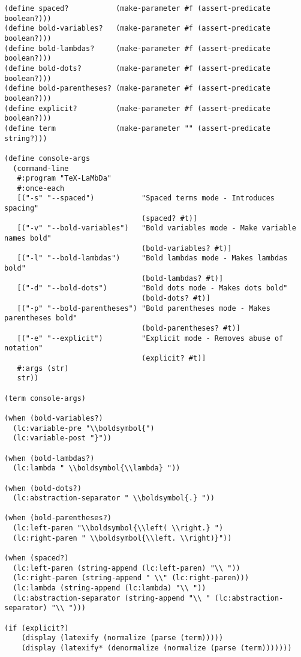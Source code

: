 \begin{verbatim}
(define spaced?           (make-parameter #f (assert-predicate boolean?)))
(define bold-variables?   (make-parameter #f (assert-predicate boolean?)))
(define bold-lambdas?     (make-parameter #f (assert-predicate boolean?)))
(define bold-dots?        (make-parameter #f (assert-predicate boolean?)))
(define bold-parentheses? (make-parameter #f (assert-predicate boolean?)))
(define explicit?         (make-parameter #f (assert-predicate boolean?)))
(define term              (make-parameter "" (assert-predicate string?)))

(define console-args
  (command-line
   #:program "TeX-LaMbDa"
   #:once-each
   [("-s" "--spaced")           "Spaced terms mode - Introduces spacing"
                                (spaced? #t)]
   [("-v" "--bold-variables")   "Bold variables mode - Make variable names bold"
                                (bold-variables? #t)]
   [("-l" "--bold-lambdas")     "Bold lambdas mode - Makes lambdas bold"
                                (bold-lambdas? #t)]
   [("-d" "--bold-dots")        "Bold dots mode - Makes dots bold"
                                (bold-dots? #t)]
   [("-p" "--bold-parentheses") "Bold parentheses mode - Makes parentheses bold"
                                (bold-parentheses? #t)]
   [("-e" "--explicit")         "Explicit mode - Removes abuse of notation"
                                (explicit? #t)]
   #:args (str)
   str))

(term console-args)

(when (bold-variables?)
  (lc:variable-pre "\\boldsymbol{")
  (lc:variable-post "}"))

(when (bold-lambdas?)
  (lc:lambda " \\boldsymbol{\\lambda} "))

(when (bold-dots?)
  (lc:abstraction-separator " \\boldsymbol{.} "))

(when (bold-parentheses?)
  (lc:left-paren "\\boldsymbol{\\left( \\right.} ")
  (lc:right-paren " \\boldsymbol{\\left. \\right)}"))

(when (spaced?)
  (lc:left-paren (string-append (lc:left-paren) "\\ "))
  (lc:right-paren (string-append " \\" (lc:right-paren)))
  (lc:lambda (string-append (lc:lambda) "\\ "))
  (lc:abstraction-separator (string-append "\\ " (lc:abstraction-separator) "\\ ")))

(if (explicit?)
    (display (latexify (normalize (parse (term)))))
    (display (latexify* (denormalize (normalize (parse (term)))))))
\end{verbatim}

